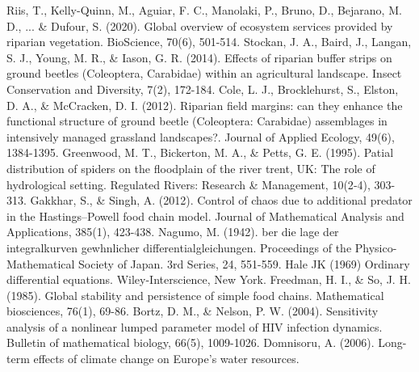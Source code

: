 \documentclass[12pt,a4wide]{report}
\numberwithin{equation}{chapter}
\numberwithin{theorem}{chapter}
\begin{document}
\begin{thebibliography}{99}
  Riis, T., Kelly-Quinn, M., Aguiar, F. C., Manolaki, P., Bruno, D., Bejarano, M. D., ... \& Dufour, S. (2020). Global overview of ecosystem services provided by riparian vegetation. BioScience, 70(6), 501-514.
  Stockan, J. A., Baird, J., Langan, S. J., Young, M. R., \& Iason, G. R. (2014). Effects of riparian buffer strips on ground beetles (Coleoptera, Carabidae) within an agricultural landscape. Insect Conservation and Diversity, 7(2), 172-184.
  Cole, L. J., Brocklehurst, S., Elston, D. A., \& McCracken, D. I. (2012). Riparian field margins: can they enhance the functional structure of ground beetle (Coleoptera: Carabidae) assemblages in intensively managed grassland landscapes?. Journal of Applied Ecology, 49(6), 1384-1395.
  Greenwood, M. T., Bickerton, M. A., \& Petts, G. E. (1995). Patial distribution of spiders on the floodplain of the river trent, UK: The role of hydrological setting. Regulated Rivers: Research \& Management, 10(2‐4), 303-313.
  Gakkhar, S., \& Singh, A. (2012). Control of chaos due to additional predator in the Hastings–Powell food chain model. Journal of Mathematical Analysis and Applications, 385(1), 423-438.
  Nagumo, M. (1942). ber die lage der integralkurven gewhnlicher differentialgleichungen. Proceedings of the Physico-Mathematical Society of Japan. 3rd Series, 24, 551-559.
  Hale JK (1969) Ordinary differential equations. Wiley-Interscience, New York.
  Freedman, H. I., \& So, J. H. (1985). Global stability and persistence of simple food chains. Mathematical biosciences, 76(1), 69-86.
  Bortz, D. M., \& Nelson, P. W. (2004). Sensitivity analysis of a nonlinear lumped parameter model of HIV infection dynamics. Bulletin of mathematical biology, 66(5), 1009-1026.
  Domnisoru, A. (2006). Long-term effects of climate change on Europe's water resources.

\end{thebibliography}
\end{document}
